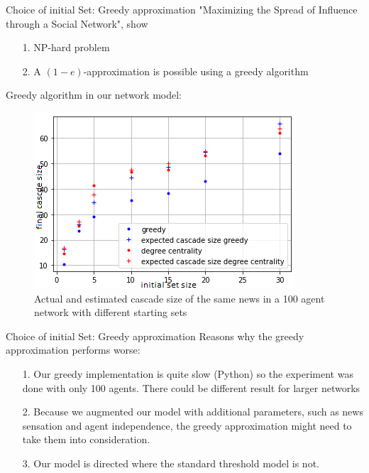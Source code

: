 \documentclass{beamer}
\begin{document}
\begin{frame}{Choice of initial Set: Greedy approximation}
    "Maximizing the Spread of Influence through a Social Network"\footnotemark, show
    \begin{enumerate}
        \item [1.] NP-hard problem
        \item [2.] A $(1-e)$-approximation is possible using a greedy algorithm
    \end{enumerate}
    Greedy algorithm in our network model:
    \begin{figure}
        \centering
        \includegraphics[width=.4\linewidth]{images/greedy.png}
        \caption{Actual and estimated cascade size of the same news in a 100 agent network with different starting sets}
    \end{figure}
\end{frame}

\begin{frame}{Choice of initial Set: Greedy approximation}
    Reasons why the greedy approximation performs worse:
    \begin{enumerate}
        \item [1.] Our greedy implementation is quite slow (Python) so the experiment was done with only 100 agents. There could be different result for larger networks
        \item[2.] Because we augmented our model with additional parameters, such as news sensation and agent independence, the greedy approximation might need to take them into consideration.
        \item[3.] Our model is directed where the standard threshold model is not.
    \end{enumerate}
\end{frame}
\end{document}
